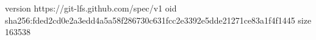 version https://git-lfs.github.com/spec/v1
oid sha256:fded2cd0e2a3edd4a5a58f286730c631fcc2e3392e5dde21271ce83a1f4f1445
size 163538
